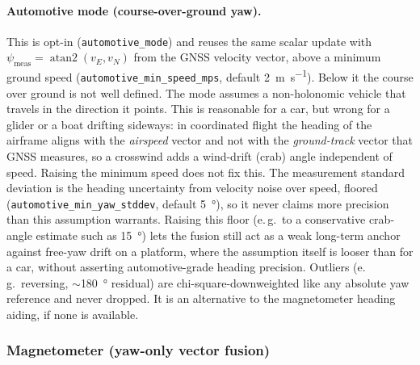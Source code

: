 \documentclass[11pt,a4paper]{article}
\newcommand{\code}[1]{\texttt{#1}}
\begin{document}
\paragraph{Automotive mode (course-over-ground yaw).} This is opt-in
(\code{automotive\_\allowbreak{}mode}) and reuses the same scalar update with
$\psi_{\text{meas}} = \operatorname{atan2}(v_E, v_N)$ from the GNSS
velocity vector, above a minimum ground speed
(\code{automotive\_\allowbreak{}min\_\allowbreak{}speed\_\allowbreak{}mps}, default \SI{2}{\metre\per\second}).
Below it the course over ground is not well defined. The mode assumes a
non-holonomic vehicle that travels in the direction it points. This is
reasonable for a car, but wrong for a glider or a boat drifting sideways: in
coordinated flight the heading of the airframe aligns with the
\emph{airspeed} vector and not with the \emph{ground-track} vector that GNSS
measures, so a crosswind adds a wind-drift (crab) angle independent of
speed. Raising the minimum speed does not fix this. The measurement
standard deviation is the heading uncertainty from velocity noise over speed,
floored (\code{automotive\_\allowbreak{}min\_\allowbreak{}yaw\_\allowbreak{}stddev}, default \SI{5}{\degree}), so
it never claims more precision than this assumption warrants. Raising
this floor (e.\,g.\ to a conservative crab-angle estimate such as
\SI{15}{\degree}) lets the fusion still act as a weak long-term anchor
against free-yaw drift on a platform, where the assumption itself is
looser than for a car, without asserting automotive-grade heading
precision. Outliers (e.\,g.\ reversing, $\sim$\SI{180}{\degree} residual)
are chi-square-downweighted like any absolute yaw reference and never
dropped. It is an alternative to the magnetometer heading aiding, if none is
available.

\subsubsection{Magnetometer (yaw-only vector fusion)}
\label{sec:ins-mag}
\end{document}

